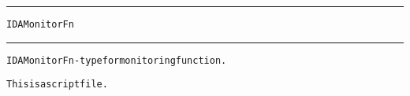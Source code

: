 \begin{samepage}
\hrule
\begin{center}
{\large \verb!IDAMonitorFn!}
\label{p:IDAMonitorFn}
\end{center}
\hrule\vspace{0.1in}



\begin{alltt}
IDAMonitorFn - type for monitoring function.
\end{alltt}

\end{samepage}



\begin{samepage}


\begin{alltt}
This is a script file. 
\end{alltt}

\end{samepage}



